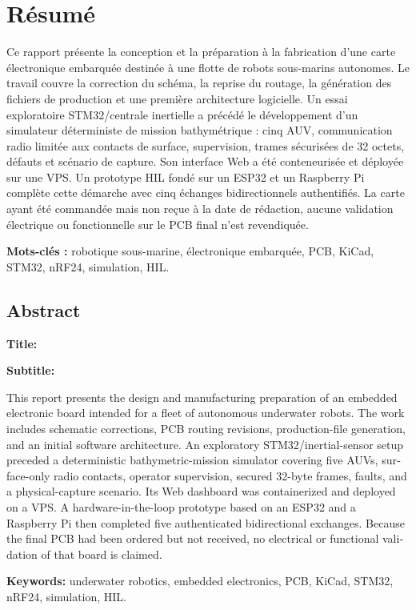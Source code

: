 \clearpage
{}
{}

\section*{Résumé}

Ce rapport présente la conception et la préparation à la fabrication d'une carte électronique embarquée destinée à une flotte de robots sous-marins autonomes. Le travail couvre la correction du schéma, la reprise du routage, la génération des fichiers de production et une première architecture logicielle. Un essai exploratoire STM32/centrale inertielle a précédé le développement d'un simulateur déterministe de mission bathymétrique : cinq AUV, communication radio limitée aux contacts de surface, supervision, trames sécurisées de 32 octets, défauts et scénario de capture. Son interface Web a été conteneurisée et déployée sur une VPS. Un prototype HIL fondé sur un ESP32 et un Raspberry Pi complète cette démarche avec cinq échanges bidirectionnels authentifiés. La carte ayant été commandée mais non reçue à la date de rédaction, aucune validation électrique ou fonctionnelle sur le PCB final n'est revendiquée.

\textbf{Mots-clés :} robotique sous-marine, électronique embarquée, PCB, KiCad, STM32, nRF24, simulation, HIL.

\vspace{8mm}

\begin{otherlanguage}{english}
\section*{Abstract}

\noindent\textbf{Title:} \ReportTitleEN

\smallskip
\noindent\textbf{Subtitle:} \ReportSubtitleEN

\smallskip

This report presents the design and manufacturing preparation of an embedded electronic board intended for a fleet of autonomous underwater robots. The work includes schematic corrections, PCB routing revisions, production-file generation, and an initial software architecture. An exploratory STM32/inertial-sensor setup preceded a deterministic bathymetric-mission simulator covering five AUVs, surface-only radio contacts, operator supervision, secured 32-byte frames, faults, and a physical-capture scenario. Its Web dashboard was containerized and deployed on a VPS. A hardware-in-the-loop prototype based on an ESP32 and a Raspberry Pi then completed five authenticated bidirectional exchanges. Because the final PCB had been ordered but not received, no electrical or functional validation of that board is claimed.

\textbf{Keywords:} underwater robotics, embedded electronics, PCB, KiCad, STM32, nRF24, simulation, HIL.
\end{otherlanguage}

\clearpage
